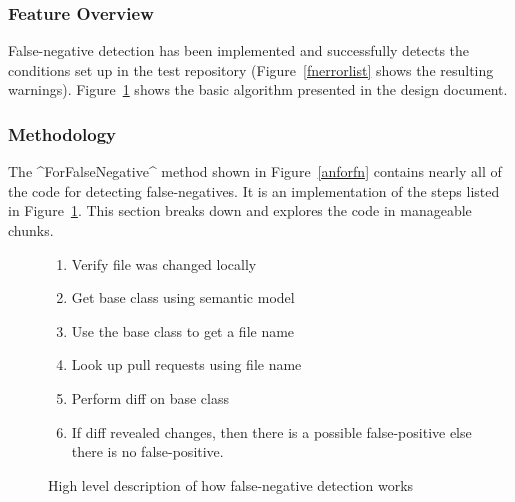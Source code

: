 \documentclass[draftclsnofoot,onecolumn]{IEEEtran}
\begin{document}
\subsubsection{Feature Overview}

False-negative detection has been implemented and successfully detects the conditions set up in the test repository (Figure~\ref{fnerrorlist} shows the resulting warnings). Figure~\ref{fnalgore} shows the basic algorithm presented in the design document.

\subsubsection{Methodology}
The ^ForFalseNegative^ method shown in Figure~\ref{anforfn} contains nearly all of the code for detecting false-negatives. It is an implementation of the steps listed in Figure~\ref{fnalgore}. This section breaks down and explores the code in manageable chunks.

\begin{figure}[ht]
\centering
\begin{enumerate}
    \item Verify file was changed locally
    \item Get base class using semantic model
    \item Use the base class to get a file name
    \item Look up pull requests using file name
    \item Perform diff on base class
    \item If diff revealed changes, then there is a possible false-positive 
else there is no false-positive.
\end{enumerate}
\caption{High level description of how false-negative detection works}
\label{fnalgore}
\end{figure}
\end{document}
